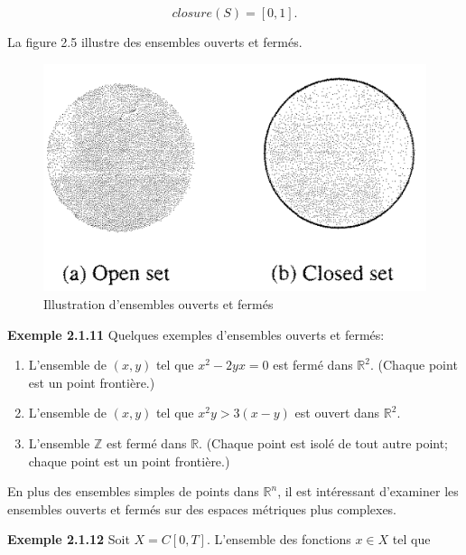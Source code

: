 \documentclass[10pt,twoside,a4paper]{book}
\begin{document}
\begin{equation*}
  closure(S) = [0, 1].
\end{equation*}


\vspace{2mm}
\noindent
La figure 2.5 illustre des ensembles ouverts et fermés.

\begin{figure}[h]
  \centering
  \includegraphics[scale=0.5]{fig2.5}
  \caption{Illustration d'ensembles ouverts et fermés}
\end{figure}

\vspace{4mm}
\noindent
\textbf{Exemple 2.1.11} Quelques exemples d'ensembles ouverts et fermés:

\begin{enumerate}
  \item L'ensemble de $(x, y)$ tel que $x^2-2yx = 0$ est fermé dans $\mathbb{R}^2$. (Chaque point est un point frontière.)
  \item L'ensemble de $(x, y)$ tel que $x^2y > 3(x - y)$ est ouvert dans $\mathbb{R}^2$.
  \item L'ensemble $\mathbb{Z}$ est fermé dans $\mathbb{R}$. (Chaque point est isolé de tout autre point; chaque point est un point frontière.)
\end{enumerate}

\noindent
En plus des ensembles simples de points dans $\mathbb{R}^n$, il est intéressant d'examiner les ensembles ouverts et fermés sur des espaces métriques plus complexes.

\vspace{4mm}
\noindent
\textbf{Exemple 2.1.12} Soit $X = C[0, T]$. L'ensemble des fonctions $x \in X$ tel que
\end{document}
